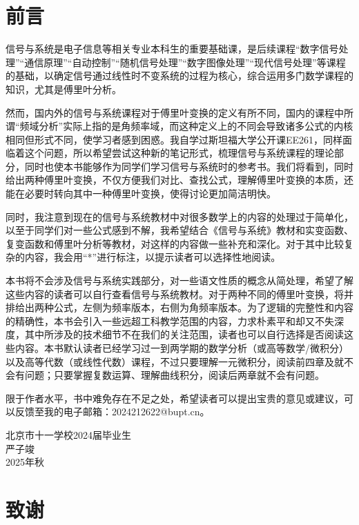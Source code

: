 \frontmatter%
\chapter*{前言}
信号与系统是电子信息等相关专业本科生的重要基础课，是后续课程“数字信号处理”“通信原理”“自动控制”“随机信号处理”“数字图像处理”“现代信号处理”等课程的基础，以确定信号通过线性时不变系统的过程为核心，综合运用多门数学课程的知识，尤其是傅里叶分析。

然而，国内外的信号与系统课程对于傅里叶变换的定义有所不同，国内的课程中所谓“频域分析”实际上指的是角频率域，而这种定义上的不同会导致诸多公式的内核相同但形式不同，使学习者感到困惑。我自学过斯坦福大学公开课EE261，同样面临着这个问题，所以希望尝试这种新的笔记形式，梳理信号与系统课程的理论部分，同时也使本书能够作为同学们学习信号与系统时的参考书。我们将看到，同时给出两种傅里叶变换，不仅方便我们对比、查找公式，理解傅里叶变换的本质，还能在必要时转向其中一种傅里叶变换，使得讨论更加简洁明快。

同时，我注意到现在的信号与系统教材中对很多数学上的内容的处理过于简单化，以至于同学们对一些公式感到不解，我希望结合《信号与系统》教材和实变函数、复变函数和傅里叶分析等教材，对这样的内容做一些补充和深化。对于其中比较复杂的内容，我会用“*”进行标注，以提示读者可以选择性地阅读。

本书将不会涉及信号与系统实践部分，对一些语文性质的概念从简处理，希望了解这些内容的读者可以自行查看信号与系统教材。对于两种不同的傅里叶变换，将并排给出两种公式，左侧为频率版本，右侧为角频率版本。为了逻辑的完整性和内容的精确性，本书会引入一些远超工科教学范围的内容，力求朴素平和却又不失深度，其中所涉及的技术细节不在我们的关注范围，读者也可以自行选择是否阅读这些内容。本书默认读者已经学习过一到两学期的数学分析（或高等数学/微积分）以及高等代数（或线性代数）课程，不过只要理解一元微积分，阅读前四章及就不会有问题；只要掌握复数运算、理解曲线积分，阅读后两章就不会有问题。

限于作者水平，书中难免存在不足之处，希望读者可以提出宝贵的意见或建议，可以反馈至我的电子邮箱：2024212622@bupt.cn。

{
\raggedleft{}
北京市十一学校2024届毕业生\\
严子竣\\
2025年秋\\
}

\chapter*{致谢}

